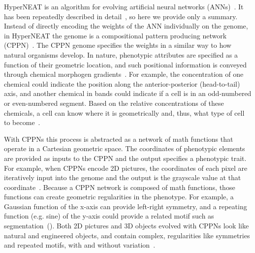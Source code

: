 HyperNEAT is an algorithm for evolving artificial neural networks (ANNs)~\cite{stanley2009hypercube}. It has been repeatedly described in detail~\cite{stanley2009hypercube,gauci2007generating,clune2011performance},  so here we provide only a summary. Instead of directly encoding the weights of the ANN individually on the genome, in HyperNEAT the genome is a compositional pattern producing network (CPPN)~\cite{stanley2007CPPN}. The CPPN genome specifies the weights in a similar way to how natural organisms develop. In nature, phenotypic attributes are specified as a function of their geometric location, and such positional information is conveyed through chemical morphogen gradients~\cite{carroll2005endless}. For example, the concentration of one chemical could indicate the position along the anterior-posterior (head-to-tail) axis, and another chemical in bands could indicate if a cell is in an odd-numbered or even-numbered segment. Based on the relative concentrations of these chemicals, a cell can know where it is geometrically and, thus, what type of cell to become~\cite{carroll2005endless}. 

With CPPNs this process is abstracted as a network of math functions that operate in a Cartesian geometric space. The coordinates of phenotypic elements are provided as inputs to the CPPN and the output specifies a phenotypic trait. For example, when CPPNs encode 2D pictures, the coordinates of each pixel are iteratively input into the genome and the output is the grayscale value at that coordinate~\cite{secretan2011picbreeder}. Because a CPPN network is composed of math functions, those functions can create geometric regularities in the phenotype. For example, a Gaussian function of the x-axis can provide left-right symmetry, and a repeating function (e.g. sine) of the y-axis could provide a related motif such as segmentation~(). Both 2D pictures and 3D objects evolved with CPPNs look like natural and engineered objects, and contain complex, regularities like symmetries and repeated motifs, with and without variation~\cite{secretan2011picbreeder,clune2011objects}. 



